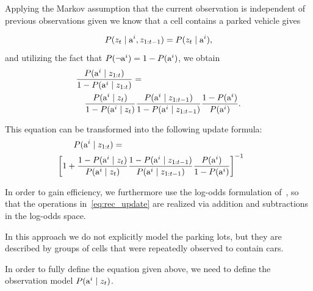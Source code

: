 Applying the Markov assumption that the current observation is independent of
previous observations given we know that a cell contains a parked vehicle
gives

\begin{equation}
P(z_{t} \mid {\mbox{a}^i}, z_{1:t-1}) = P(z_{t} \mid {\mbox{a}^i}),
\end{equation}
\noindent
and utilizing the fact that $P(\neg {\mbox{a}^i}) = 1 - P({\mbox{a}^i})$, we obtain
\begin{eqnarray}
\lefteqn{\frac{ P(\v \mid z_{1:t}) }{ 1 - P(\v \mid z_{1:t})} = } \nonumber \\
&&\frac{ P( \v \mid \z)}{ 1 - P(\v \mid \z)}   \frac{ P(\v \mid \y)}{ 1 - P(\v \mid  \y)}   \frac{ 1 - P(\v)}{ P(\v)}.
\end{eqnarray}

\noindent
This equation can be transformed into the following update formula:
\begin{eqnarray}
\label{eq:rec_update}
\hspace{-6mm}\lefteqn{P(\v\mid z_{1:t})=} \nonumber \\
&& \hspace{-10mm} \left[ 1 + \frac{1 - P(\v\mid \z)}{P(\v \mid \z)}
\frac{1 - P(\v \mid \y)}{P(\v \mid \y)}   \frac{P(\v)}{1 - P(\v)}  \right]^{-1}
\end{eqnarray}
\noindent

In order to gain efficiency, we furthermore use the log-odds  formulation of~\citet{occupancy_grids}, so that the
operations in~\eqref{eq:rec_update} are realized via addition and
subtractions in the log-odds space.

In this approach we do not explicitly model the parking lots, but they are
described by groups of cells that were repeatedly observed to contain cars.

In order to fully define the equation given above, we need to define the
observation model $P({\mbox{a}^i} \mid z_t)$.


